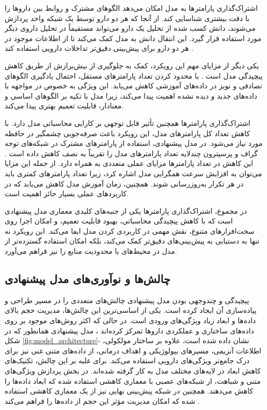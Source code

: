 اشتراک‌گذاری پارامترها به مدل امکان می‌دهد الگوهای مشترک و روابط بین داروها را با دقت بیشتری شناسایی کند. از آنجا که هر دو دارو توسط یک شبکه واحد پردازش می‌شوند، دانش کسب شده از تحلیل یک دارو می‌تواند مستقیماً در تحلیل داروی دیگر مورد استفاده قرار گیرد. این انتقال دانش به مدل کمک می‌کند تا از اطلاعات موجود در هر دو دارو برای پیش‌بینی دقیق‌تر تداخلات دارویی استفاده کند \cite{ref_deng2020}.

یکی دیگر از مزایای مهم این رویکرد، کمک به جلوگیری از بیش‌برازش از طریق کاهش پیچیدگی مدل است \cite{ref_xu2019}. با محدود کردن تعداد پارامترهای مستقل، احتمال یادگیری الگوهای تصادفی و نویز در داده‌های آموزشی کاهش می‌یابد. این ویژگی به خصوص در مواجهه با داده‌های جدید و دیده نشده اهمیت پیدا می‌کند، زیرا مدل با تکیه بر الگوهای اساسی و معنادار، قابلیت تعمیم بهتری پیدا می‌کند.

اشتراک‌گذاری پارامترها همچنین تأثیر قابل توجهی بر کارایی محاسباتی مدل دارد. با کاهش تعداد کل پارامترهای مدل، این رویکرد باعث صرفه‌جویی چشمگیر در حافظه مورد نیاز می‌شود. در مدل پیشنهادی، استفاده از پارامترهای مشترک در شبکه‌های توجه گراف و پرسپترون چندلایه تعداد پارامترهای مدل را تقریباً به نصف کاهش داده است \cite{ref_dai2020}. این کاهش در تعداد پارامترها مزایای عملی متعددی به همراه دارد. از جمله این مزایا می‌توان به افزایش سرعت همگرایی مدل اشاره کرد، زیرا تعداد پارامترهای کمتری باید در هر تکرار به‌روزرسانی شوند. همچنین، زمان آموزش مدل کاهش می‌یابد که در کاربردهای عملی بسیار حائز اهمیت است.

در مجموع، اشتراک‌گذاری پارامترها یکی از جنبه‌های کلیدی معماری مدل پیشنهادی است که با کاهش پیچیدگی محاسباتی، بهبود قابلیت تعمیم، و امکان اجرا روی سخت‌افزارهای متنوع، نقش مهمی در کاربردی کردن مدل ایفا می‌کند. این رویکرد نه تنها به دستیابی به پیش‌بینی‌های دقیق‌تر کمک می‌کند، بلکه امکان استفاده گسترده‌تر از مدل در محیط‌های با محدودیت منابع را نیز فراهم می‌آورد.

\subsection{چالش‌ها و نوآوری‌های مدل پیشنهادی}

پیچیدگی و چندوجهی بودن مدل پیشنهادی چالش‌های متعددی را در مسیر طراحی و پیاده‌سازی آن ایجاد کرده است. یکی از اساسی‌ترین این چالش‌ها، مدیریت حجم بالای داده‌ها و ابعاد زیاد ویژگی‌های ورودی است. در حالی که اکثر روش‌های موجود بر روی داده‌های ساختاری و عملکردی داروها تمرکز کرده‌اند \cite{ref_deng2020, ref_shi2024}، مدل پیشنهادی همانطور که در شکل \ref{fig:model_architecture}- نشان داده شده است، علاوه بر ساختار مولکولی، اطلاعات آنزیمی، مسیرهای بیولوژیکی و اهداف درمانی، از داده‌های متنی غنی نیز برای درک جامع‌تر ویژگی‌های دارویی استفاده می‌کند. برای غلبه بر این چالش، تکنیک‌های کاهش ابعاد در لایه‌های مختلف مدل به کار گرفته شده‌اند. در بخش پردازش ویژگی‌های متنی و شباهت، از شبکه‌های عصبی با معماری کاهشی استفاده شده که ابعاد داده‌ها را کاهش می‌دهند. همچنین در شبکه پیش‌بینی نهایی نیز از یک معماری کاهشی استفاده شده که امکان مدیریت مؤثر این حجم از داده‌ها را فراهم می‌کند \cite{ref_dai2020}.

